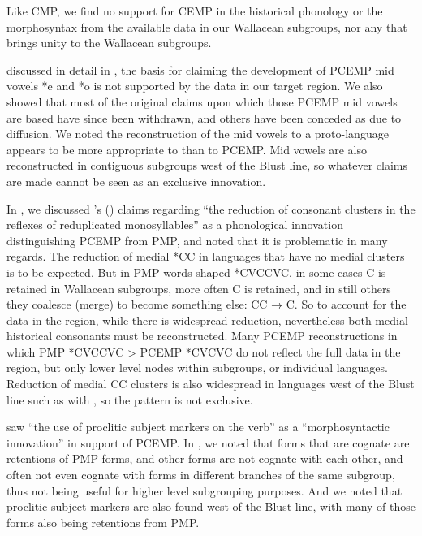 Like CMP,
we find no support for CEMP in the historical phonology or the
morphosyntax from the available data in our Wallacean subgroups,
nor any that brings unity to the Wallacean subgroups.

 discussed in detail in ,
the basis for claiming the development of PCEMP mid vowels *e
and *o is not supported by the data in our target region.
We also showed that most of the original claims upon which those
PCEMP mid vowels are based have since been withdrawn,
and others have been conceded as due to diffusion.
We noted the reconstruction of the mid vowels to a proto-language
appears to be more appropriate to  than to PCEMP.
Mid vowels are also reconstructed in contiguous subgroups west
of the Blust line,
so whatever claims are made cannot be seen as an exclusive innovation.

In , we discussed \citeauthor{Blust1993}’s
(\citeyear[246]{Blust1993}) claims regarding
“the reduction of consonant clusters in the reflexes of reduplicated
monosyllables” as a phonological innovation distinguishing PCEMP
from PMP, and noted that it is problematic in many regards.
The reduction of medial *CC in languages that have no medial
clusters is to be expected.
But in PMP words shaped *CVCCVC,
in some cases C is retained in Wallacean subgroups,
more often C is retained,
and in still others they coalesce (merge) to become something
else: CC  → C.
So to account for the data in the region,
while there is widespread reduction,
nevertheless both medial historical consonants must be reconstructed.
Many PCEMP reconstructions in which PMP *CVCCVC > PCEMP *CVCVC
do not reflect the full data in the region,
but only lower level nodes within subgroups, or individual languages.
Reduction of medial CC clusters is also widespread in languages
west of the Blust line such as with ,
so the pattern is not exclusive.

\citet[258]{Blust1993} saw “the use of proclitic subject markers
on the verb” as a “morphosyntactic innovation” in support of PCEMP.
In , we noted that forms that are cognate are retentions
of PMP forms, and other forms are not cognate with each other,
and often not even cognate with forms in different branches of
the same subgroup, thus not being useful for higher level subgrouping purposes.
And we noted that proclitic subject markers are also found west
of the Blust line,
with many of those forms also being retentions from PMP.

